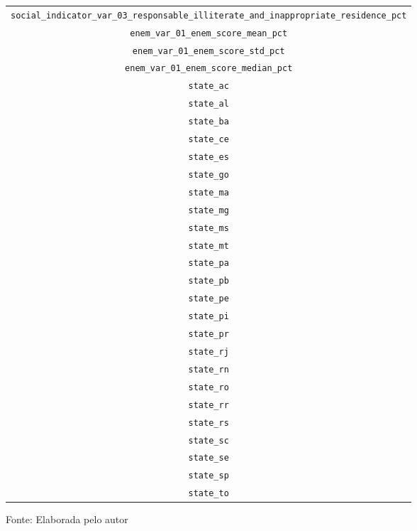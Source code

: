 \begin{table}[h]
\begin{adjustbox}{height=8.0cm}
\begin{tabular}{c}
\scriptsize \verb|social_indicator_var_03_responsable_illiterate_and_inappropriate_residence_pct| \\
\scriptsize \verb|enem_var_01_enem_score_mean_pct| \\
\scriptsize \verb|enem_var_01_enem_score_std_pct| \\
\scriptsize \verb|enem_var_01_enem_score_median_pct| \\
\scriptsize \verb|state_ac| \\
\scriptsize \verb|state_al| \\
\scriptsize \verb|state_ba| \\
\scriptsize \verb|state_ce| \\
\scriptsize \verb|state_es| \\
\scriptsize \verb|state_go| \\
\scriptsize \verb|state_ma| \\
\scriptsize \verb|state_mg| \\
\scriptsize \verb|state_ms| \\
\scriptsize \verb|state_mt| \\
\scriptsize \verb|state_pa| \\
\scriptsize \verb|state_pb| \\
\scriptsize \verb|state_pe| \\
\scriptsize \verb|state_pi| \\
\scriptsize \verb|state_pr| \\
\scriptsize \verb|state_rj| \\
\scriptsize \verb|state_rn| \\
\scriptsize \verb|state_ro| \\
\scriptsize \verb|state_rr| \\
\scriptsize \verb|state_rs| \\
\scriptsize \verb|state_sc| \\
\scriptsize \verb|state_se| \\
\scriptsize \verb|state_sp| \\
\scriptsize \verb|state_to| \\
\hline
\end{tabular}
\end{adjustbox}

Fonte: Elaborada pelo autor
\end{table}
